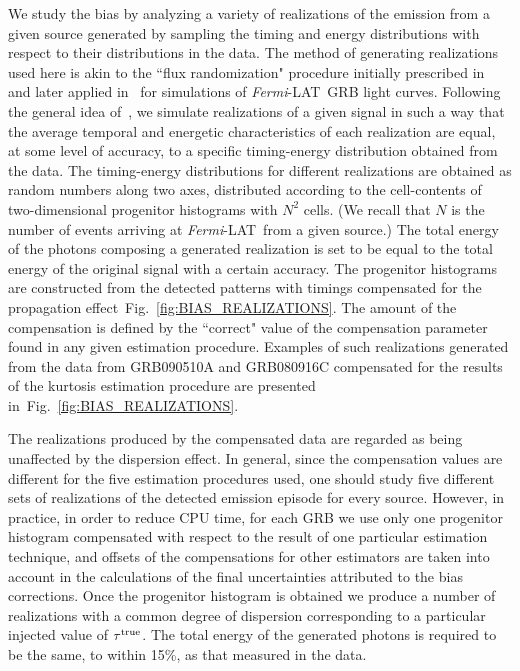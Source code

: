 \documentclass[12pt]{article}
\newcommand{\lat}{{\it Fermi}-LAT}
\begin{document}
{We study the bias by analyzing a variety of realizations of the emission from a given source generated by
sampling the timing and energy distributions with respect to their distributions in the data.
The method of generating realizations used here is akin to the ``flux randomization" procedure initially prescribed in~\cite{biasMC} and
later applied in~\cite{GBMlagLAT} for simulations of \lat\ GRB light curves. Following the general idea of~\cite{biasMC},
we simulate realizations of a given signal in such a way that the average temporal and energetic characteristics of each realization
are equal, at some level of accuracy, to a specific timing-energy distribution obtained from the data.
The timing-energy distributions for different realizations are obtained as random numbers along two axes, distributed
according to the cell-contents of two-dimensional progenitor histograms with $N^2$ cells.
(We recall that $N$ is the number of events arriving at \lat~from a given source.)
The total energy of the photons composing a generated realization is set to be equal
to the total energy of the original signal with a certain accuracy.
The progenitor histograms are constructed from the detected
patterns with timings compensated for the propagation effect~Fig.~\ref{fig:BIAS_REALIZATIONS}.
The amount of the compensation is defined by the ``correct" value of
the compensation parameter found in any given estimation procedure. Examples of such realizations
generated from the data from GRB090510A and GRB080916C compensated for the results of the kurtosis estimation procedure are
presented in~Fig.~\ref{fig:BIAS_REALIZATIONS}.

The realizations produced by the compensated data are regarded as being unaffected by the dispersion effect.
In general, since the compensation values are different for the five estimation procedures used, one should study five different sets
of realizations of the detected emission episode for every source. However, in practice, in order to reduce CPU time,
for each GRB we use only one progenitor histogram compensated with respect to the result of one particular estimation technique, and
offsets of the compensations for other estimators are taken into account in the calculations of the final
uncertainties attributed to the bias corrections.
Once the progenitor histogram is obtained we produce a number of realizations with a common degree of dispersion
corresponding to a particular injected value of $\tau ^{\rm true}$. The total energy of
the generated photons is required to be the same, to within 15\%, as that measured in the data.

}
\end{document}
